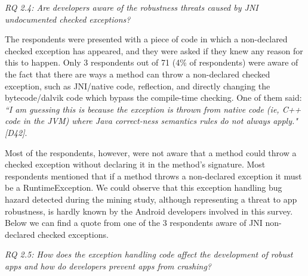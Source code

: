 \bigskip
\noindent\emph{RQ 2.4: Are developers aware of the robustness threats caused by JNI undocumented checked exceptions?}
\bigskip

The respondents were presented with a piece of code in which a non-declared checked exception has appeared, and they were asked if they knew any reason for this to happen. Only 3 respondents out of 71 (4\% of respondents) were aware of the fact that there are ways a method can throw a non-declared checked exception, such as JNI/native code, reflection, and directly changing the bytecode/dalvik code which bypass the compile-time checking. One of them said: \emph{``I am guessing this is because the exception is thrown from native code (ie, C++ code in the JVM) where Java correct-ness semantics rules do not always apply." [D42]}.  

Most of the respondents, however, were not aware that a method could throw a checked exception without declaring it in the method's signature. Most respondents mentioned that if a method throws a non-declared exception it must be a RuntimeException. We could observe that this exception handling bug hazard detected during the mining study, although representing a threat to app robustness, is hardly known by the Android developers involved in this survey. Below we can find a quote from one of the 3 respondents aware of JNI non-declared checked exceptions.

\bigskip 


\bigskip 





\noindent\emph{RQ 2.5: How does the exception handling code affect the development of robust apps and how do developers prevent apps from crashing?}

